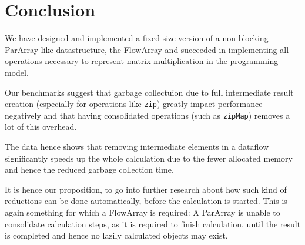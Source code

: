 \documentclass[runningheads,a4paper,fleqn]{llncs}
\begin{document}
\section{Conclusion}
\label{sec:conclusion}

We have designed and implemented a fixed-size version of a non-blocking
ParArray like datastructure, the FlowArray and succeeded in
implementing all operations necessary to represent matrix
multiplication in the programming model.

Our benchmarks suggest that garbage collectuion due to full
intermediate result creation (especially for operations like
\texttt{zip}) greatly impact performance negatively and that having
consolidated operations (such as \texttt{zipMap}) removes a lot of
this overhead.

The data hence shows that removing intermediate elements in a dataflow
significantly speeds up the whole calculation due to the fewer
allocated memory and hence the reduced garbage collection time.

It is hence our proposition, to go into further research about how
such kind of reductions can be done automatically, before the
calculation is started. This is again something for which a FlowArray
is required: A ParArray is unable to consolidate calculation steps, as
it is required to finish calculation, until the result is completed
and hence no lazily calculated objects may exist.



\end{document}
